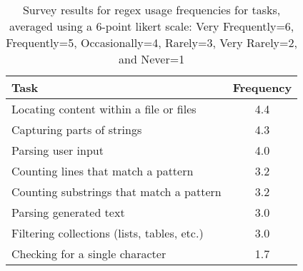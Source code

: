 \begin{table}
\caption{Survey results for regex usage frequencies for tasks, averaged using a 6-point likert scale: Very Frequently=6, Frequently=5, Occasionally=4, Rarely=3, Very Rarely=2, and Never=1 \label{tab:regextasks}}
\begin{center}
\begin{small}
\begin{tabular}{l|c}
\toprule
\textbf{Task} & \textbf{Frequency} \\  \midrule \bigstrut
Locating content within a file or files & 4.4\\ \midrule \bigstrut
Capturing parts of strings & 4.3 \\ \midrule \bigstrut
Parsing user input & 4.0\\ \midrule \bigstrut
Counting lines that match a pattern & 3.2\\ \midrule \bigstrut
Counting  substrings that match a pattern & 3.2\\  \midrule \bigstrut
Parsing generated text & 3.0\\  \midrule \bigstrut
Filtering collections (lists, tables, etc.) & 3.0 \\ \midrule \bigstrut
Checking for a single character & 1.7\\
\bottomrule
\end{tabular}
\end{small}
\end{center}
\vspace{-12pt}
\end{table}
